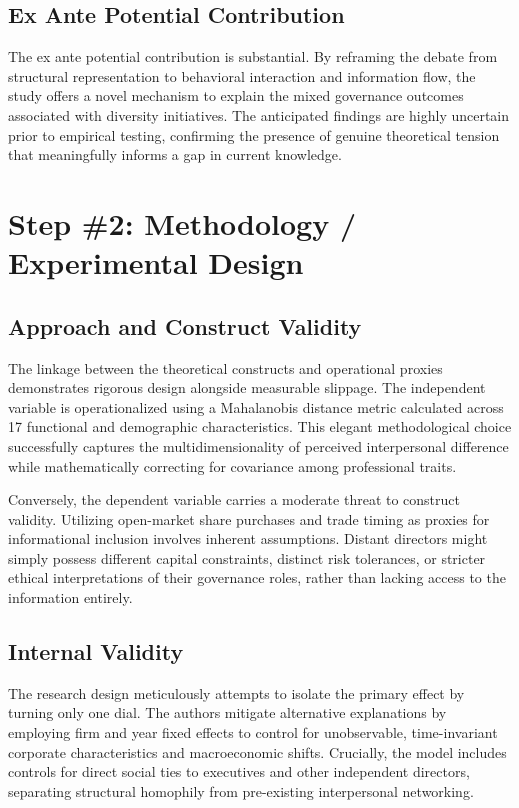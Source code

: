 \documentclass[11pt, a4paper]{article}
\begin{document}
\subsection*{Ex Ante Potential Contribution}
The ex ante potential contribution is substantial. By reframing the debate from structural representation to behavioral interaction and information flow, the study offers a novel mechanism to explain the mixed governance outcomes associated with diversity initiatives. The anticipated findings are highly uncertain prior to empirical testing, confirming the presence of genuine theoretical tension that meaningfully informs a gap in current knowledge.

\section*{Step \#2: Methodology / Experimental Design}

\subsection*{Approach and Construct Validity}
The linkage between the theoretical constructs and operational proxies demonstrates rigorous design alongside measurable slippage. The independent variable is operationalized using a Mahalanobis distance metric calculated across 17 functional and demographic characteristics. This elegant methodological choice successfully captures the multidimensionality of perceived interpersonal difference while mathematically correcting for covariance among professional traits.

Conversely, the dependent variable carries a moderate threat to construct validity. Utilizing open-market share purchases and trade timing as proxies for informational inclusion involves inherent assumptions. Distant directors might simply possess different capital constraints, distinct risk tolerances, or stricter ethical interpretations of their governance roles, rather than lacking access to the information entirely.

\subsection*{Internal Validity}
The research design meticulously attempts to isolate the primary effect by turning only one dial. The authors mitigate alternative explanations by employing firm and year fixed effects to control for unobservable, time-invariant corporate characteristics and macroeconomic shifts. Crucially, the model includes controls for direct social ties to executives and other independent directors, separating structural homophily from pre-existing interpersonal networking.
\end{document}
